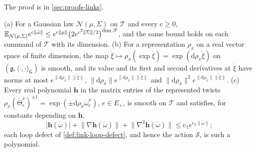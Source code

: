 The proof is in \cref{sec:proofs-links}.

(a) For a Gaussian law $\mathcal N(\mu,\Sigma)$ on $\mathscr T$ and every $\mathrm c\geq0$,
$\mathbb E_{\mathcal N(\mu,\Sigma)}e^{\mathrm c\lVert\mathring\omega\rVert}\leq e^{\mathrm c\lVert\mu\rVert}\bigl(2e^{\mathrm c^2\lVert\Sigma\rVert/2}\bigr)^{\dim\mathscr T}$,
and the same bound holds on each summand of $\mathscr T$ with its dimension.
(b) For a representation $\rho_x$ on a real vector space of finite dimension, the map
$\mathring\xi\mapsto\rho_x(\exp\mathring\xi)=\exp(\mathrm d\rho_x\mathring\xi)$ on
$(\mathfrak g,\langle\cdot,\cdot\rangle_{\mathsf G})$ is smooth, and its value and its first and second
derivatives at $\mathring\xi$ have norms at most $e^{\lVert\mathrm d\rho_x\rVert\lVert\mathring\xi\rVert}$,
$\lVert\mathrm d\rho_x\rVert e^{\lVert\mathrm d\rho_x\rVert\lVert\mathring\xi\rVert}$ and
$\lVert\mathrm d\rho_x\rVert^2e^{\lVert\mathrm d\rho_x\rVert\lVert\mathring\xi\rVert}$. (c) Every real polynomial
$\mathbf h$ in the matrix entries of the represented twists
$\rho_x(\mathring\Theta^x_e)^{\pm1}=\exp(\pm\mathrm d\rho_x\mathring\omega^x_e)$, $e\in E_+$, is smooth on
$\mathscr T$ and satisfies, for constants depending on $\mathbf h$,
\begin{equation}
\lvert\mathbf h(\mathring\omega)\rvert+\lVert\nabla\mathbf h(\mathring\omega)\rVert
+\lVert\nabla^2\mathbf h(\mathring\omega)\rVert\leq\mathrm c_1e^{\mathrm c_2\lVert\mathring\omega\rVert};
\label{eq:link-growth}
\end{equation}
each loop defect of \cref{def:link-loop-defect}, and hence the action $\mathscr S$, is such a polynomial.


